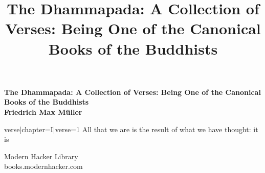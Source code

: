\documentclass[12pt]{article}
\title{The Dhammapada: A Collection of Verses: Being One of the Canonical Books of the Buddhists}
\begin{document}
\thispagestyle{empty}
\begin{center}
\textbf{\Large The Dhammapada: A Collection of Verses: Being One of the Canonical Books of the Buddhists}\\
\textbf{Friedrich Max M\"{u}ller}\\

\end{center}

{{verse|chapter=I|verse=1}} All that we are is the result of what we have thought: it is 


\vfill
\begin{center}
{\selectfont 
Modern Hacker Library\\books.modernhacker.com}
\end{center}
\end{document}
